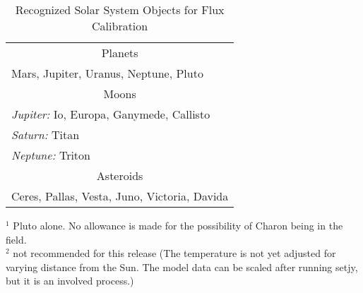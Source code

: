 \vspace{5mm}
\begin{table}[h!]
\caption{Recognized Solar System Objects for Flux Calibration
        {\label{table:fluxcal-table-solarsystem}}}
\begin{center}
\begin{tabular}{|l|} \hline
\hline
\multicolumn{1}{|c|}{Planets} \\

Mars, Jupiter, Uranus, Neptune, Pluto\footnotemark[1]\\
\hline
\multicolumn{1}{|c|}{Moons}\\
{\it Jupiter:} Io, Europa, Ganymede, Callisto\\
{\it Saturn:}  Titan \\
{\it Neptune:} Triton \\
\hline
\multicolumn{1}{|c|}{Asteroids}\\
Ceres, Pallas\footnotemark[2], Vesta\footnotemark[2], Juno\footnotemark[2], Victoria\footnotemark[2], Davida\footnotemark[2]\\
\hline
\end{tabular}
\end{center}
\footnotesize
$^1$ Pluto alone.  No allowance is made for the possibility of Charon
  being in the field.\\
$^2$ not recommended for this release (The temperature is not yet adjusted
   for varying distance from the Sun.  The model data can be scaled after
   running setjy, but it is an involved process.)
\normalsize

\end{table}


